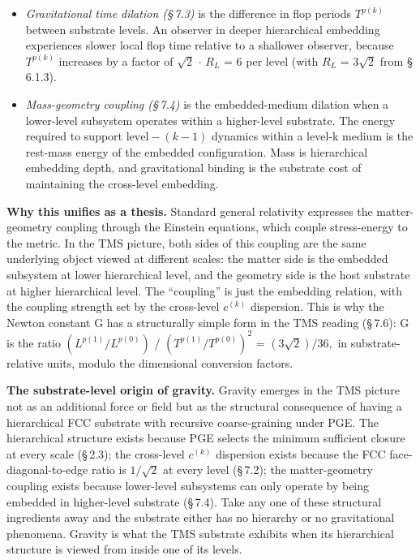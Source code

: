 \documentclass[11pt,oneside]{report}
\theoremstyle{definition}
\theoremstyle{remark}
\begin{document}
\begin{itemize}
\item
  \emph{Gravitational time dilation (\S\,7.3)} is the difference in flop
  periods \ensuremath{T^{p(k)}} between substrate levels. An observer in deeper
  hierarchical embedding experiences slower local flop time relative to
  a shallower observer, because \ensuremath{T^{p(k)}} increases by a factor of \ensuremath{\sqrt{2}} \ensuremath{\cdot}
  \ensuremath{R_{L}} = 6 per level (with \ensuremath{R_{L}} = \ensuremath{3\sqrt{2}} from \S\,6.1.3).
\end{itemize}

\begin{itemize}
\item
  \emph{Mass-geometry coupling (\S\,7.4)} is the embedded-medium dilation
  when a lower-level subsystem operates within a higher-level substrate.
  The energy required to support \ensuremath{\text{level}-(k-1)} dynamics within a level-k
  medium is the rest-mass energy of the embedded configuration. Mass is
  hierarchical embedding depth, and gravitational binding is the
  substrate cost of maintaining the cross-level embedding.
\end{itemize}

\textbf{Why this unifies as a thesis.} Standard general relativity
expresses the matter-geometry coupling through the Einstein equations,
which couple stress-energy to the metric. In the TMS picture, both sides
of this coupling are the same underlying object viewed at different
scales: the matter side is the embedded subsystem at lower hierarchical
level, and the geometry side is the host substrate at higher
hierarchical level. The ``coupling'' is just the embedding relation,
with the coupling strength set by the cross-level \ensuremath{c^{(k)}} dispersion. This
is why the Newton constant G has a structurally simple form in the TMS
reading (\S\,7.6): G is the ratio \ensuremath{(L^{p(1)}/L^{p(0)})} / \ensuremath{(T^{p(1)}/T^{p(0)})^{2}} =
\ensuremath{(3\sqrt{2})/36,} in substrate-relative units, modulo the dimensional conversion
factors.

\textbf{The substrate-level origin of gravity.} Gravity emerges in the
TMS picture not as an additional force or field but as the structural
consequence of having a hierarchical FCC substrate with recursive
coarse-graining under PGE. The hierarchical structure exists because PGE
selects the minimum sufficient closure at every scale (\S\,2.3); the
cross-level \ensuremath{c^{(k)}} dispersion exists because the FCC face-diagonal-to-edge
ratio is \ensuremath{1/\sqrt{2}} at every level (\S\,7.2); the matter-geometry coupling exists
because lower-level subsystems can only operate by being embedded in
higher-level substrate (\S\,7.4). Take any one of these structural
ingredients away and the substrate either has no hierarchy or no
gravitational phenomena. Gravity is what the TMS substrate exhibits when
its hierarchical structure is viewed from inside one of its levels.
\end{document}

